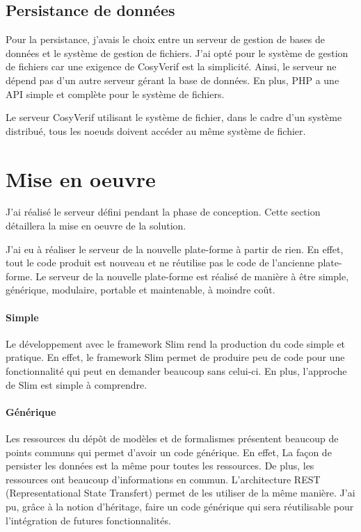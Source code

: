 \documentclass{report}
\begin{document}
\subsection{Persistance de données}

Pour la persistance, j'avais le choix entre un serveur de gestion de bases de données et le système de gestion de fichiers.
J'ai opté pour le système de gestion de fichiers car une exigence de
CosyVerif est la simplicité.
Ainsi, le serveur ne dépend pas
d'un autre serveur gérant la base de données. En plus, PHP a une API simple et complète pour le système de 
fichiers.

Le serveur CosyVerif utilisant le système de fichier, dans le cadre d'un système distribué, tous
les noeuds doivent accéder au même système de fichier.

\section{Mise en oeuvre}

J'ai réalisé le serveur défini pendant la phase de conception.
Cette section détaillera la mise en oeuvre de la solution.

J'ai eu à réaliser le serveur de la nouvelle plate-forme à partir de rien. En effet, tout le code produit est nouveau et ne 
réutilise pas le code de l'ancienne plate-forme. Le serveur de la nouvelle plate-forme est réalisé de manière à être simple,
générique, modulaire, portable et maintenable, à moindre coût. 

\paragraph{Simple}
Le développement avec le framework Slim rend la production du code simple et pratique. En effet, le framework Slim permet
de produire peu de code pour une fonctionnalité qui peut en demander beaucoup sans celui-ci. En plus, l'approche de Slim est 
simple à comprendre.

\paragraph{Générique}
Les ressources du dépôt de modèles et de formalismes présentent beaucoup de points communs qui permet d'avoir
un code générique. En effet, La façon de persister les données est la même
pour toutes les ressources.
De plus, les ressources 
ont beaucoup d'informations en commun.
L'architecture REST (Representational State Transfert) permet de les utiliser de 
la même manière. J'ai pu, grâce à la notion d'héritage, faire un code
générique qui sera réutilisable pour l'intégration de futures fonctionnalités.
\end{document}
